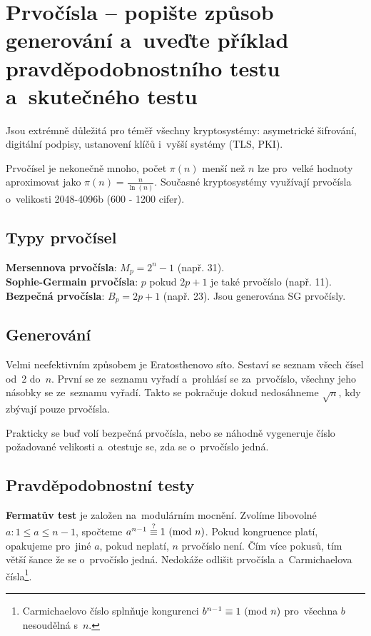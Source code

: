 \section{Prvočísla -- popište způsob generování a~uveďte příklad pravděpodobnostního testu a~skutečného testu}

Jsou extrémně důležitá pro téměř všechny kryptosystémy: asymetrické šifrování, digitální podpisy, ustanovení klíčů i~vyšší systémy (TLS, PKI).

Prvočísel je nekonečně mnoho, počet $\pi(n)$ menší než $n$ lze pro~velké hodnoty aproximovat jako $\pi(n) = \frac{n}{\ln(n)}$. Současné kryptosystémy využívají prvočísla o~velikosti 2048-4096b (600 - 1200 cifer).

\subsection{Typy prvočísel}

\textbf{Mersennova prvočísla}: $M_p = 2^n - 1$ (např. 31). \\
\textbf{Sophie-Germain prvočísla}: $p$ pokud $2p + 1$ je také prvočíslo (např. 11). \\
\textbf{Bezpečná prvočísla}: $B_p = 2p + 1$ (např. 23). Jsou generována SG prvočísly.

\subsection{Generování}

Velmi neefektivním způsobem je Eratosthenovo síto. Sestaví se seznam všech čísel od~2 do~$n$. První se ze~seznamu vyřadí a~prohlásí se za~prvočíslo, všechny jeho násobky se ze~seznamu vyřadí. Takto se pokračuje dokud nedosáhneme $\sqrt{n}$, kdy zbývají pouze prvočísla.

Prakticky se buď volí bezpečná prvočísla, nebo se náhodně vygeneruje číslo požadované velikosti a~otestuje se, zda se o~prvočíslo jedná.

\subsection{Pravděpodobnostní testy}

\textbf{Fermatův test} je založen na~modulárním mocnění. Zvolíme libovolné $a: 1 \leq a \leq n-1$, spočteme $a^{n-1} \stackrel{?}{\equiv} 1 \ (\mathrm{mod}\ n)$. Pokud kongruence platí, opakujeme pro~jiné $a$, pokud neplatí, $n$ prvočíslo není. Čím více pokusů, tím větší šance že se o~prvočíslo jedná. Nedokáže odlišit prvočísla a~Carmichaelova čísla\footnote{%
Carmichaelovo číslo splnňuje kongurenci $b^{n-1} \equiv 1 \ (\mathrm{mod}\ n)$ pro~všechna $b$ nesoudělná s~$n$.
}.

